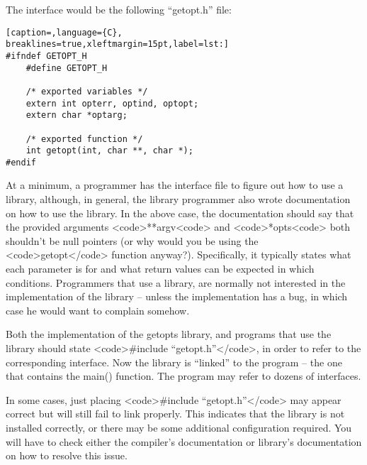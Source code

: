 The interface would be the following ``getopt.h'' file:
\lstset{basicstyle=\scriptsize, numbers=left, captionpos=b, tabsize=4}
\begin{lstlisting}[caption=,language={C},
breaklines=true,xleftmargin=15pt,label=lst:]
#ifndef GETOPT_H
	#define GETOPT_H
 
	/* exported variables */
	extern int opterr, optind, optopt;
	extern char *optarg;
 
	/* exported function */
	int getopt(int, char **, char *);
#endif
\end{lstlisting}

At a minimum, a programmer has the interface file to figure out how to use a
library, although, in general, the library programmer also wrote documentation
on how to use the library. In the above case, the documentation should say that
the provided arguments
\textless{}code\textgreater{}**argv\textless{}code\textgreater{} and
\textless{}code\textgreater{}*opts\textless{}code\textgreater{} both shouldn't
be null pointers (or why would you be using the
\textless{}code\textgreater{}getopt\textless{}/code\textgreater{} function
anyway?). Specifically, it typically states what each parameter is for and what
return values can be expected in which conditions. Programmers that use a
library, are normally not interested in the implementation of the library --
unless the implementation has a bug, in which case he would want to complain
somehow.

Both the implementation of the getopts library, and programs that use the
library should state \textless{}code\textgreater{}\#include
``getopt.h''\textless{}/code\textgreater{}, in order to refer to the
corresponding interface. Now the library is ``linked'' to the program -- the
one that contains the main() function. The program may refer to dozens of
interfaces.

In some cases, just placing \textless{}code\textgreater{}\#include
``getopt.h''\textless{}/code\textgreater{} may appear correct but will still
fail to link properly. This indicates that the library is not installed
correctly, or there may be some additional configuration required. You will
have to check either the compiler's documentation or library's documentation on
how to resolve this issue. 
